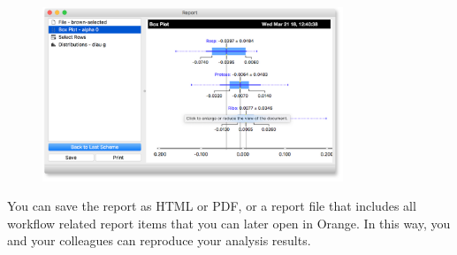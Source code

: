 \begin{figure}[h]
  \centering
  \includegraphics[width=90mm]{saving-fig2.png}%
  \label{fig:saveing-fig2}
\end{figure}

You can save the report as HTML or PDF, or a report file that includes all workflow related report items that you can later open in Orange. In this way, you and your colleagues can reproduce your analysis results.
